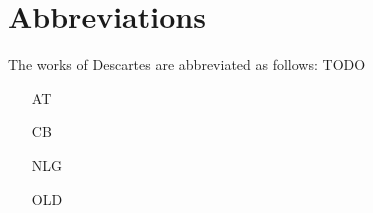 \chapter{Abbreviations}

The works of Descartes are abbreviated as follows: TODO

\begin{itemize}
    \item[AT] 
    \item[CB] 
    \item[NLG] 
    \item[OLD] 
\end{itemize}
